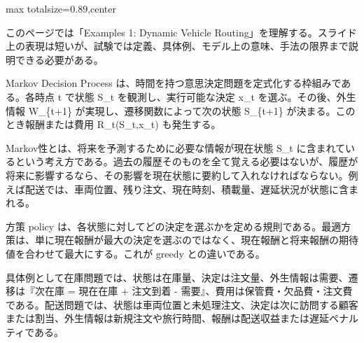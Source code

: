 \begin{minipage}[t]{0.58\textwidth}
\begin{adjustbox}{max totalsize={\textwidth}{0.89\textheight},center}
\begin{minipage}{\textwidth}\scriptsize
{}このページでは「Examples 1: Dynamic Vehicle Routing」を理解する。スライド上の表現は短いが、試験では定義、具体例、モデル上の意味、手法の限界まで説明できる必要がある。\par
Markov Decision Process は、時間を持つ意思決定問題を定式化する枠組みである。各時点 t で状態 S\_t を観測し、実行可能な決定 x\_t を選ぶ。その後、外生情報 W\_\{t+1\} が実現し、遷移関数によって次の状態 S\_\{t+1\} が決まる。このとき報酬または費用 R\_t(S\_t,x\_t) も発生する。\par
Markov性とは、将来を予測するために必要な情報が現在状態 S\_t に含まれているという考え方である。過去の履歴そのものを全て覚える必要はないが、履歴が将来に影響するなら、その影響を現在状態に要約して入れなければならない。例えば配送では、車両位置、残り注文、現在時刻、積載量、遅延状況が状態に含まれる。\par
方策 policy は、各状態に対してどの決定を選ぶかを定める規則である。最適方策は、単に現在報酬が最大の決定を選ぶのではなく、現在報酬と将来報酬の期待値を合わせて最大にする。これが greedy との違いである。\par
具体例として在庫問題では、状態は在庫量、決定は注文量、外生情報は需要、遷移は『次在庫 = 現在在庫 + 注文到着 - 需要』、費用は保管費・欠品費・注文費である。配送問題では、状態は車両位置と未処理注文、決定は次に訪問する顧客または割当、外生情報は新規注文や旅行時間、報酬は配送収益または遅延ペナルティである。\par

\end{minipage}
\end{adjustbox}
\end{minipage}

